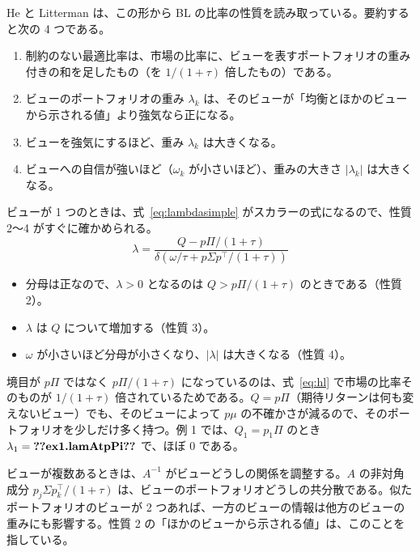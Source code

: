 \documentclass[xelatex,ja=standard,jafont=hiragino-pron,a4paper,11pt,openany]{bxjsreport}
\makeatletter
\newcommand{\V}[1]{\ifcsname v@#1\endcsname\csname v@#1\endcsname\else\textbf{??#1??}\fi}
\newcommand{\T}{^{\top}}
\makeatother
\begin{document}
He と Litterman は、この形から BL の比率の性質を読み取っている。要約すると次の 4 つである。

\begin{thmbox}
\begin{enumerate}
\item 制約のない最適比率は、市場の比率に、ビューを表すポートフォリオの重み付きの和を足したもの（を $1/(1+\tau)$ 倍したもの）である。
\item ビューのポートフォリオの重み $\lambda_k$ は、そのビューが「均衡とほかのビューから示される値」より強気なら正になる。
\item ビューを強気にするほど、重み $\lambda_k$ は大きくなる。
\item ビューへの自信が強いほど（$\omega_k$ が小さいほど）、重みの大きさ $|\lambda_k|$ は大きくなる。
\end{enumerate}
\end{thmbox}

ビューが 1 つのときは、式~\eqref{eq:lambdasimple} がスカラーの式になるので、性質 2〜4 がすぐに確かめられる。
\begin{equation}
\lambda = \frac{Q - p\Pi/(1 + \tau)}{\delta\left(\omega/\tau + p\Sigma p\T/(1 + \tau)\right)}
\label{eq:lambdaone}
\end{equation}
\begin{itemize}
\item 分母は正なので、$\lambda > 0$ となるのは $Q > p\Pi/(1 + \tau)$ のときである（性質 2）。
\item $\lambda$ は $Q$ について増加する（性質 3）。
\item $\omega$ が小さいほど分母が小さくなり、$|\lambda|$ は大きくなる（性質 4）。
\end{itemize}

境目が $p\Pi$ ではなく $p\Pi/(1 + \tau)$ になっているのは、式~\eqref{eq:hl} で市場の比率そのものが $1/(1 + \tau)$ 倍されているためである。$Q = p\Pi$（期待リターンは何も変えないビュー）でも、そのビューによって $p\mu$ の不確かさが減るので、そのポートフォリオを少しだけ多く持つ。例 1 では、$Q_1 = p_1\Pi$ のとき $\lambda_1 = \V{ex1.lamAtpPi}$ で、ほぼ 0 である。

ビューが複数あるときは、$A^{-1}$ がビューどうしの関係を調整する。$A$ の非対角成分 $p_j\Sigma p_k\T/(1 + \tau)$ は、ビューのポートフォリオどうしの共分散である。似たポートフォリオのビューが 2 つあれば、一方のビューの情報は他方のビューの重みにも影響する。性質 2 の「ほかのビューから示される値」は、このことを指している。
\end{document}
